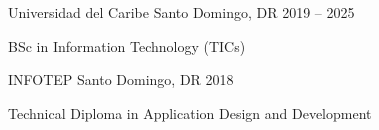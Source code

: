 \documentclass[]{awesome-cv}
\begin{document}
\begin{cventries}
	\vspace{-3mm}
	\cventry
	{}
	{Universidad del Caribe \vspace{-5mm}}
	{Santo Domingo, DR \vspace{-5mm}}
	{2019 -- 2025 \vspace{-5mm}}
	{\begin{cvsectionnormaltext}
		\item{BSc in Information Technology (TICs)}
	\end{cvsectionnormaltext}}

	\vspace{-3mm}
	\cventry
	{}
	{INFOTEP \vspace{-5mm}}
	{Santo Domingo, DR \vspace{-5mm}}
	{2018 \vspace{-5mm}}
	{\begin{cvsectionnormaltext}
		\item{Technical Diploma in Application Design and Development}
	\end{cvsectionnormaltext}}
\end{cventries}
\end{document}
